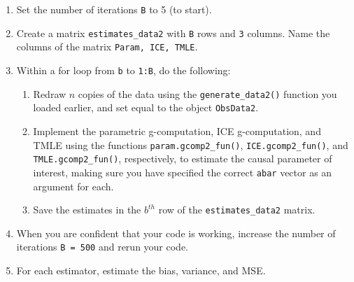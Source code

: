 \documentclass[answers]{exam}
\begin{document}
\begin{enumerate}
\item Set the number of iterations \texttt{B} to 5 (to start).
\item Create a matrix \texttt{estimates\_data2} with \texttt{B} rows and \texttt{3} columns. Name the columns of the matrix \texttt{Param, ICE, TMLE}.
\item Within a for loop from \texttt{b} to \texttt{1:B}, do the following:
\begin{enumerate}
\item Redraw $n$ copies of the data using the \texttt{generate\_data2()} function you loaded earlier, and set equal to the object \texttt{ObsData2}. 
\item Implement the parametric g-computation, ICE g-computation, and TMLE using the functions \texttt{param.gcomp2\_fun()}, \texttt{ICE.gcomp2\_fun()}, and \texttt{TMLE.gcomp2\_fun()}, respectively, to estimate the causal parameter of interest, making sure you have specified the correct \texttt{abar} vector as an argument for each.
\item Save the estimates in the $b^{th}$ row of the \texttt{estimates\_data2} matrix.
\end{enumerate}
\item When you are confident that your code is working, increase the number of iterations \texttt{B = 500} and rerun your code. 
\item For each estimator, estimate the bias, variance, and MSE.
\end{enumerate}
\end{document}
